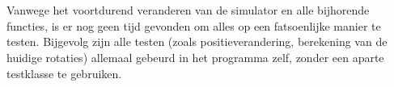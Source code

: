 \\
\\
Vanwege het voortdurend veranderen van de simulator en alle bijhorende functies, is er nog geen tijd gevonden om alles op een fatsoenlijke manier te testen. Bijgevolg zijn alle testen (zoals positieverandering, berekening van de huidige rotaties) allemaal gebeurd in het programma zelf, zonder een aparte testklasse te gebruiken.

